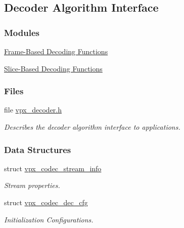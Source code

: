 \hypertarget{group__decoder}{\subsection{Decoder Algorithm Interface}
\label{group__decoder}
}
\subsubsection*{Modules}
\begin{DoxyCompactItemize}
\item 
\hyperlink{group__cap__put__frame}{Frame-\/\-Based Decoding Functions}
\item 
\hyperlink{group__cap__put__slice}{Slice-\/\-Based Decoding Functions}
\end{DoxyCompactItemize}
\subsubsection*{Files}
\begin{DoxyCompactItemize}
\item 
file \hyperlink{vpx__decoder_8h}{vpx\-\_\-decoder.\-h}
\begin{DoxyCompactList}\small\item\em Describes the decoder algorithm interface to applications. \end{DoxyCompactList}\end{DoxyCompactItemize}
\subsubsection*{Data Structures}
\begin{DoxyCompactItemize}
\item 
struct \hyperlink{structvpx__codec__stream__info}{vpx\-\_\-codec\-\_\-stream\-\_\-info}
\begin{DoxyCompactList}\small\item\em Stream properties. \end{DoxyCompactList}\item 
struct \hyperlink{structvpx__codec__dec__cfg}{vpx\-\_\-codec\-\_\-dec\-\_\-cfg}
\begin{DoxyCompactList}\small\item\em Initialization Configurations. \end{DoxyCompactList}\end{DoxyCompactItemize}
